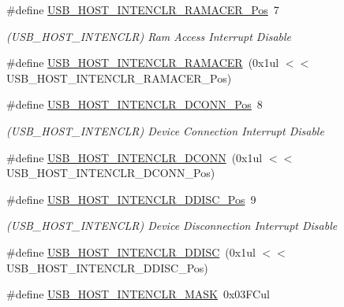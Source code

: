 \begin{DoxyCompactItemize}
\item 
\#define \mbox{\hyperlink{group___s_a_m_d21___u_s_b_ga77a71e060e15b083ecf8e1c46bfad4a9}{U\+S\+B\+\_\+\+H\+O\+S\+T\+\_\+\+I\+N\+T\+E\+N\+C\+L\+R\+\_\+\+R\+A\+M\+A\+C\+E\+R\+\_\+\+Pos}}~7
\begin{DoxyCompactList}\small\item\em (U\+S\+B\+\_\+\+H\+O\+S\+T\+\_\+\+I\+N\+T\+E\+N\+C\+LR) Ram Access Interrupt Disable \end{DoxyCompactList}\item 
\#define \mbox{\hyperlink{group___s_a_m_d21___u_s_b_ga37be090f8bab71d0f51e758f2b37ef32}{U\+S\+B\+\_\+\+H\+O\+S\+T\+\_\+\+I\+N\+T\+E\+N\+C\+L\+R\+\_\+\+R\+A\+M\+A\+C\+ER}}~(0x1ul $<$$<$ U\+S\+B\+\_\+\+H\+O\+S\+T\+\_\+\+I\+N\+T\+E\+N\+C\+L\+R\+\_\+\+R\+A\+M\+A\+C\+E\+R\+\_\+\+Pos)
\item 
\#define \mbox{\hyperlink{group___s_a_m_d21___u_s_b_gaa45a1af9df74efbc6bc277212eb45233}{U\+S\+B\+\_\+\+H\+O\+S\+T\+\_\+\+I\+N\+T\+E\+N\+C\+L\+R\+\_\+\+D\+C\+O\+N\+N\+\_\+\+Pos}}~8
\begin{DoxyCompactList}\small\item\em (U\+S\+B\+\_\+\+H\+O\+S\+T\+\_\+\+I\+N\+T\+E\+N\+C\+LR) Device Connection Interrupt Disable \end{DoxyCompactList}\item 
\#define \mbox{\hyperlink{group___s_a_m_d21___u_s_b_ga95aa602d635d96842b2cf9ba73326a65}{U\+S\+B\+\_\+\+H\+O\+S\+T\+\_\+\+I\+N\+T\+E\+N\+C\+L\+R\+\_\+\+D\+C\+O\+NN}}~(0x1ul $<$$<$ U\+S\+B\+\_\+\+H\+O\+S\+T\+\_\+\+I\+N\+T\+E\+N\+C\+L\+R\+\_\+\+D\+C\+O\+N\+N\+\_\+\+Pos)
\item 
\#define \mbox{\hyperlink{group___s_a_m_d21___u_s_b_gac71d14dd438e3ffeac3f064b2935a17c}{U\+S\+B\+\_\+\+H\+O\+S\+T\+\_\+\+I\+N\+T\+E\+N\+C\+L\+R\+\_\+\+D\+D\+I\+S\+C\+\_\+\+Pos}}~9
\begin{DoxyCompactList}\small\item\em (U\+S\+B\+\_\+\+H\+O\+S\+T\+\_\+\+I\+N\+T\+E\+N\+C\+LR) Device Disconnection Interrupt Disable \end{DoxyCompactList}\item 
\#define \mbox{\hyperlink{group___s_a_m_d21___u_s_b_ga59288373e48c544f456dc07114151715}{U\+S\+B\+\_\+\+H\+O\+S\+T\+\_\+\+I\+N\+T\+E\+N\+C\+L\+R\+\_\+\+D\+D\+I\+SC}}~(0x1ul $<$$<$ U\+S\+B\+\_\+\+H\+O\+S\+T\+\_\+\+I\+N\+T\+E\+N\+C\+L\+R\+\_\+\+D\+D\+I\+S\+C\+\_\+\+Pos)
\item 
\#define \mbox{\hyperlink{group___s_a_m_d21___u_s_b_gac81bab6a534ae1535f534d175a170c4a}{U\+S\+B\+\_\+\+H\+O\+S\+T\+\_\+\+I\+N\+T\+E\+N\+C\+L\+R\+\_\+\+M\+A\+SK}}~0x03\+F\+Cul
$$
\end{DoxyCompactItemize}
